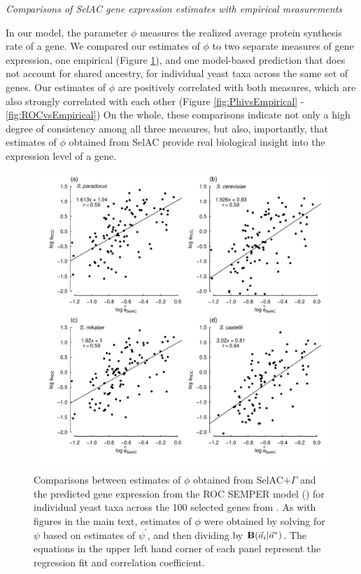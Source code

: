 \documentclass[12pt,letterpaper]{article}
\renewcommand{\subsection}[1]{%
\bigskip
\begin{center}
\begin{large}
\normalfont\itshape #1
\end{large}
\end{center}}
\newcommand{\Funcaveci}{\ensuremath{\Func(\aveci|\aoptvec)}\xspace}
\newcommand{\Func}{\ensuremath{\text{\textbf{B}}}\xspace}
\newcommand{\selacplusgamma}{SelAC$+\Gamma$\xspace}
\newcommand{\aoptvec}{\ensuremath{\Vec{a}^*}\xspace}
\newcommand{\aveci}{\ensuremath{\Vec{a}_i}\xspace}
\newcommand{\psiprime}{\ensuremath{\psi^\prime}\xspace}
\begin{document}
\subsection{Comparisons of SelAC gene expression estimates with empirical measurements}

In our model, the parameter $\phi$ measures the realized average protein synthesis rate of a gene.
We compared our estimates of $\phi$ to two separate measures of gene expression, one empirical (Figure \ref{fig:PhivsROC}), and one model-based prediction that does not account for shared ancestry, for individual yeast taxa across the same set of genes.
Our estimates of $\phi$ are positively correlated with both measures, which are also strongly correlated with each other (Figure \ref{fig:PhivsEmpirical} - \ref{fig:ROCvsEmpirical})
On the whole, these comparisons indicate not only a high degree of consistency among all three measures, but also, importantly, that estimates of $\phi$ obtained from SelAC provide real biological insight into the expression level of a gene.

\begin{figure}[H]
  \centering
  \includegraphics[width=0.9\linewidth]{FIGURE_S1_SelACwG_vs_ROC_by_spp.pdf}
  \caption{Comparisons between estimates of $\phi$ obtained from \selacplusgamma and the predicted gene expression from the ROC SEMPER model (\citet{GilchristEtAl2015}) for individual yeast taxa across the 100 selected genes from \citet{SalichosAndRokas2013}.
        As with figures in the main text, estimates of $\phi$ were obtained by solving for $\psi$ based on estimates of $\psiprime$, and then dividing by \Funcaveci.
                The equations in the upper left hand corner of each panel represent the regression fit and correlation coefficient.
  }
  \label{fig:PhivsROC}
\end{figure}
\end{document}
